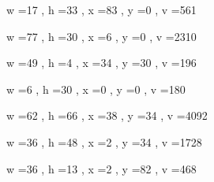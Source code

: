 \documentclass[11pt]{article}
\begin{document}
w =17 , h =33 , x =83 , y =0 , v =561
\par
w =77 , h =30 , x =6 , y =0 , v =2310
\par
w =49 , h =4 , x =34 , y =30 , v =196
\par
w =6 , h =30 , x =0 , y =0 , v =180
\par
w =62 , h =66 , x =38 , y =34 , v =4092
\par
w =36 , h =48 , x =2 , y =34 , v =1728
\par
w =36 , h =13 , x =2 , y =82 , v =468
\par
\newpage
\end{document}
